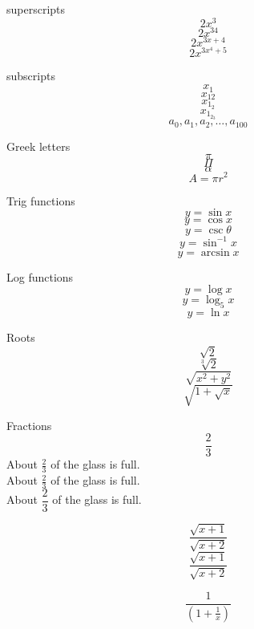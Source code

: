 \documentclass[11pt]{article}
\begin{document}
superscripts $$2x^3$$
$$2x^{34}$$
$$2x^{3x+4}$$
$$2x^{3x^4+5}$$

subscripts
$$x_1$$
$$x_{12}$$
$$x_{1_2}$$
$$x_{1_{2_3}}$$
$$a_0, a_1, a_2, \ldots, a_{100}$$

Greek letters
$$\pi$$
$$\Pi$$
$$\alpha$$
$$A=\pi r^2$$

Trig functions
$$y=\sin x$$
$$y=\cos x$$
$$y=\csc \theta$$
$$y=\sin^{-1} x$$
$$y=\arcsin x$$

Log functions
$$y=\log x$$
$$y=\log_5 x$$
$$y=\ln x$$

Roots
$$\sqrt{2}$$
$$\sqrt[3]{2}$$
$$\sqrt{x^2+y^2}$$
$$\sqrt{   1+\sqrt{x}     }$$

Fractions
$$\frac{2}{3}$$
About $\displaystyle \frac{2}{3}$ of the glass is full.\\[16pt]
About $\frac{2}{3}$ of the glass is full.\\[6pt]
About $\dfrac{2}{3}$ of the glass is full.

$$\frac{\sqrt{x+1}}{\sqrt{x+2}}$$
$$\frac{\sqrt{x+1}}{\sqrt{x+2}}$$

$$\frac{1}{      (1+\frac{1}{x})       }$$
\end{document}
